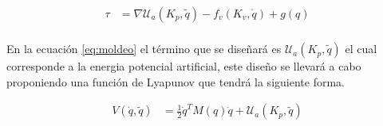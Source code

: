 \documentclass[12pt]{article}
\begin{document}
\begin{equation}
    \begin{split}
        \tau&=\nabla\mathcal{U}_a(K_p,\tilde{q})-f_v(K_v,\dot{q})+g(q)\\
    \end{split}
    \label{eq:moldeo}
\end{equation}

En la ecuación \ref{eq:moldeo} el término que se diseñará es $\mathcal{U}_a(K_p,\tilde{q})$ el cual corresponde a la energia potencial artificial, este diseño se llevará a cabo proponiendo una función de Lyapunov que tendrá la siguiente forma.

\begin{equation}
    \begin{split}
        V(\dot{q},\tilde{q})&=\frac{1}{2}\dot{q}^TM(q)\dot{q}+\mathcal{U}_a(K_p,\tilde{q})\\
    \end{split}
    \label{eq:energy}
\end{equation}
\end{document}
